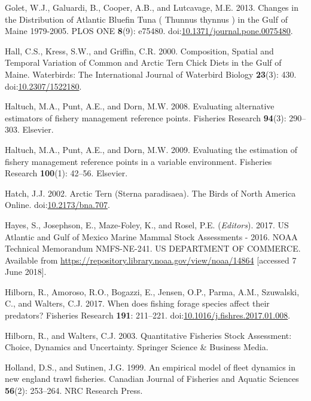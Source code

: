 \documentclass[]{article}
\begin{document}
\hypertarget{ref-golet_changes_2013}{}
Golet, W.J., Galuardi, B., Cooper, A.B., and Lutcavage, M.E. 2013.
Changes in the Distribution of Atlantic Bluefin Tuna ( Thunnus thynnus )
in the Gulf of Maine 1979-2005. PLOS ONE \textbf{8}(9): e75480.
doi:\href{https://doi.org/10.1371/journal.pone.0075480}{10.1371/journal.pone.0075480}.

\hypertarget{ref-hall_composition_2000}{}
Hall, C.S., Kress, S.W., and Griffin, C.R. 2000. Composition, Spatial
and Temporal Variation of Common and Arctic Tern Chick Diets in the Gulf
of Maine. Waterbirds: The International Journal of Waterbird Biology
\textbf{23}(3): 430.
doi:\href{https://doi.org/10.2307/1522180}{10.2307/1522180}.

\hypertarget{ref-haltuch2008evaluating}{}
Haltuch, M.A., Punt, A.E., and Dorn, M.W. 2008. Evaluating alternative
estimators of fishery management reference points. Fisheries Research
\textbf{94}(3): 290--303. Elsevier.

\hypertarget{ref-haltuch2009evaluating}{}
Haltuch, M.A., Punt, A.E., and Dorn, M.W. 2009. Evaluating the
estimation of fishery management reference points in a variable
environment. Fisheries Research \textbf{100}(1): 42--56. Elsevier.

\hypertarget{ref-hatch_arctic_2002}{}
Hatch, J.J. 2002. Arctic Tern (Sterna paradisaea). The Birds of North
America Online.
doi:\href{https://doi.org/10.2173/bna.707}{10.2173/bna.707}.

\hypertarget{ref-hayes_us_2017}{}
Hayes, S., Josephson, E., Maze-Foley, K., and Rosel, P.E.
(\emph{Editors}). 2017. US Atlantic and Gulf of Mexico Marine Mammal
Stock Assessments - 2016. NOAA Technical Memorandum NMFS-NE-241. US
DEPARTMENT OF COMMERCE. Available from
\url{https://repository.library.noaa.gov/view/noaa/14864} {[}accessed 7
June 2018{]}.

\hypertarget{ref-hilborn_when_2017}{}
Hilborn, R., Amoroso, R.O., Bogazzi, E., Jensen, O.P., Parma, A.M.,
Szuwalski, C., and Walters, C.J. 2017. When does fishing forage species
affect their predators? Fisheries Research \textbf{191}: 211--221.
doi:\href{https://doi.org/10.1016/j.fishres.2017.01.008}{10.1016/j.fishres.2017.01.008}.

\hypertarget{ref-hilborn_quantitative_2003}{}
Hilborn, R., and Walters, C.J. 2003. Quantitative Fisheries Stock
Assessment: Choice, Dynamics and Uncertainty. Springer Science \&
Business Media.

\hypertarget{ref-holland1999empirical}{}
Holland, D.S., and Sutinen, J.G. 1999. An empirical model of fleet
dynamics in new england trawl fisheries. Canadian Journal of Fisheries
and Aquatic Sciences \textbf{56}(2): 253--264. NRC Research Press.
\end{document}
